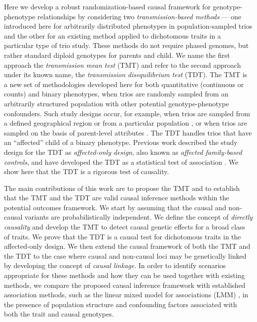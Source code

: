 \documentclass[12pt]{extarticle}
\begin{document}
Here we develop a robust randomization-based causal framework for genotype-phenotype relationships by considering two \textit{transmission-based methods} --- one introduced here for arbitrarily distributed phenotypes in population-sampled trios and the other for an existing method applied to dichotomous traits in a particular type of trio study. These methods do not require phased genomes, but rather standard diploid genotypes for parents and child. We name the first approach the \textit{transmission mean test} (TMT) and refer to the second approach under its known name, the \textit{transmission disequilibrium test} (TDT). The TMT is a new set of methodologies developed here for both quantitative (continuous or counts) and binary phenotypes, when trios are randomly sampled from an arbitrarily structured population with other potential genotype-phenotype confounders. Such study designs occur, for example, when trios are sampled from a defined geographical region \citep{pcgc2013, bycroft2018, allofus2024} or from a particular population \citep{pollin2004, goring2007}, or when trios are sampled on the basis of parent-level attributes \citep{lee2014}. The TDT handles trios that have an ``affected'' child of a binary phenotype. Previous work described the study design for the TDT as \textit{affected-only design}, also known as \textit{affected family-based controls}, and have developed the TDT as a statistical test of association \citep{thomson1988, terwilliger1992, spielman1993, ewens1995, allison1997, laird2000, laird2006}. We show here that the TDT is a rigorous test of causality. 

The main contributions of this work are to propose the TMT and to establish that the TMT and the TDT are valid causal inference methods within the potential outcomes framework. We start by assuming that the causal and non-causal variants are probabilistically independent. We define the concept of \textit{directly causality} and develop the TMT to detect causal genetic effects for a broad class of traits. We prove that the TDT is a causal test for dichotomous traits in the affected-only design. We then extend the causal framework of both the TMT and the TDT to the case where causal and non-causal loci may be genetically linked by developing the concept of \textit{causal linkage}. In order to identify scenarios appropriate for these methods and how they can be used together with existing methods, we compare the proposed causal inference framework with established association methods, such as the linear mixed model for associations (LMM) \citep{kang2010,yang2010,yang2011}, in the presence of population structure and confounding factors associated with both the trait and causal genotypes.
\end{document}

